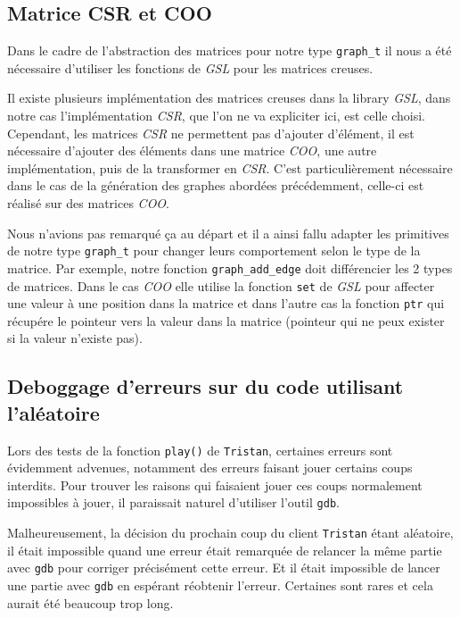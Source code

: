 \subsection{Matrice CSR et COO}
Dans le cadre de l'abstraction des matrices pour notre type \texttt{graph\_t} il nous a été nécessaire d'utiliser les fonctions de \textit{GSL} pour les matrices creuses.

Il existe plusieurs implémentation des matrices creuses dans la library \textit{GSL}, dans notre cas l'implémentation \textit{CSR}, que l'on ne va expliciter ici, est celle choisi.
Cependant, les matrices \textit{CSR} ne permettent pas d'ajouter d'élément, il est nécessaire d'ajouter des éléments dans une matrice \textit{COO}, une autre implémentation, puis de la transformer en \textit{CSR}.
C'est particulièrement nécessaire dans le cas de la génération des graphes abordées précédemment, celle-ci est réalisé sur des matrices \textit{COO}.
\bigskip

Nous n'avions pas remarqué ça au départ et il a ainsi fallu adapter les primitives de notre type \texttt{graph\_t} pour changer leurs comportement selon le type de la matrice.
Par exemple, notre fonction \texttt{graph\_add\_edge} doit différencier les 2 types de matrices.
Dans le cas \textit{COO} elle utilise la fonction \texttt{set} de \textit{GSL} pour affecter une valeur à une position dans la matrice et dans l'autre cas la fonction \texttt{ptr} qui récupére le pointeur vers la valeur dans la matrice (pointeur qui ne peux exister si la valeur n'existe pas).

\subsection{Deboggage d'erreurs sur du code utilisant l'aléatoire}

Lors des tests de la fonction \texttt{play()} de \texttt{Tristan}, certaines erreurs sont évidemment advenues, notamment des erreurs faisant jouer certains coups interdits. Pour trouver les raisons qui faisaient jouer ces coups normalement impossibles à jouer, il paraissait naturel d'utiliser l'outil \texttt{gdb}.

Malheureusement, la décision du prochain coup du client \texttt{Tristan} étant aléatoire, il était impossible quand une erreur était remarquée de relancer la même partie avec \texttt{gdb} pour corriger précisément cette erreur. Et il était impossible de lancer une partie avec \texttt{gdb} en espérant réobtenir l'erreur. Certaines sont rares et cela aurait été beaucoup trop long.

